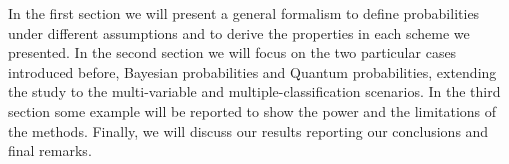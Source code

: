 \documentclass{cimento}
\begin{document}
In the first section we will present a general formalism to define probabilities under different assumptions
and to derive the properties in each scheme we presented.
In the second section we will focus on the two particular cases introduced before, Bayesian probabilities and Quantum probabilities,
extending the study to the multi-variable and multiple-classification scenarios.
In the third section some example will be reported to show the power and the limitations of the methods.
Finally, we will discuss our results reporting our conclusions and final remarks.












\begin{thebibliography}{0}



\end{thebibliography}
\end{document}

